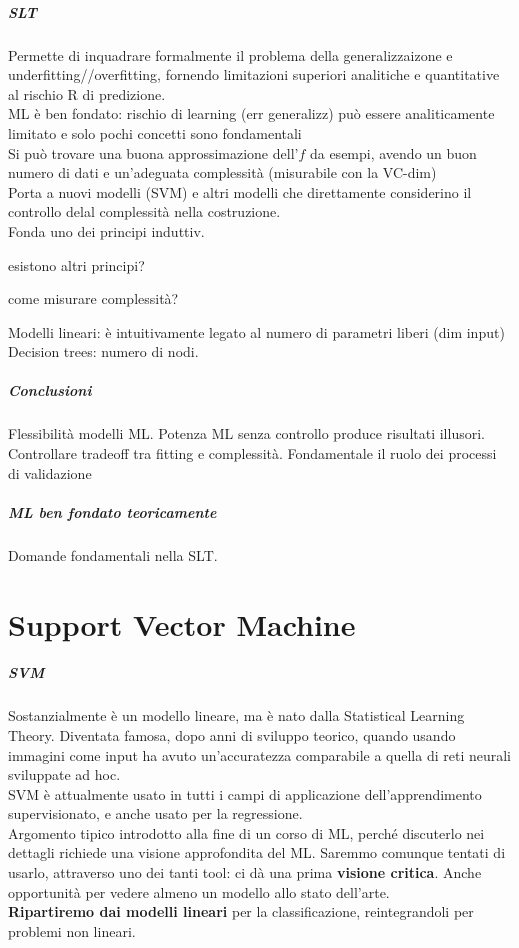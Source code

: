 \documentclass[10pt]{book}
\begin{document}
\paragraph{SLT} Permette di inquadrare formalmente il problema della generalizzaizone e underfitting//overfitting, fornendo limitazioni superiori analitiche e quantitative al rischio R di predizione.\\
ML è ben fondato: rischio di learning (err generalizz) può essere analiticamente limitato e solo pochi concetti sono fondamentali\\
Si può trovare una buona approssimazione dell'$f$ da esempi, avendo un buon numero di dati e un'adeguata complessità (misurabile con la VC-dim)\\
Porta a nuovi modelli (SVM) e altri modelli che direttamente considerino il controllo delal complessità nella costruzione.\\
Fonda uno dei principi induttiv.
\begin{list}{}{}
	\item esistono altri principi?
	\item come misurare complessità?
\end{list}
Modelli lineari:  è intuitivamente legato al numero di parametri liberi (dim input)\\
Decision trees: numero di nodi.
\paragraph{Conclusioni} Flessibilità modelli ML. Potenza ML senza controllo produce risultati illusori. Controllare tradeoff tra fitting e complessità. Fondamentale il ruolo dei processi di validazione
\paragraph{ML ben fondato teoricamente} Domande fondamentali nella SLT.
\chapter{Support Vector Machine}
\paragraph{SVM} Sostanzialmente è un modello lineare, ma è nato dalla Statistical Learning Theory. Diventata famosa, dopo anni di sviluppo teorico, quando usando immagini come input ha avuto un'accuratezza comparabile a quella di reti neurali sviluppate ad hoc.\\
SVM è attualmente usato in tutti i campi di applicazione dell'apprendimento supervisionato, e anche usato per la regressione.\\
Argomento tipico introdotto alla fine di un corso di ML, perché discuterlo nei dettagli richiede una visione approfondita del ML. Saremmo comunque tentati di usarlo, attraverso uno dei tanti tool: ci dà una prima \textbf{visione critica}. Anche opportunità per vedere almeno un modello allo stato dell'arte.\\
\textbf{Ripartiremo dai modelli lineari} per la classificazione, reintegrandoli per problemi non lineari.
\end{document}
